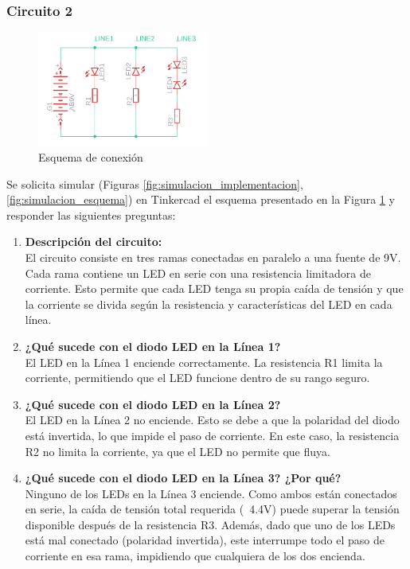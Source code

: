 \documentclass{article}
\begin{document}
\subsubsection{Circuito 2}

\begin{figure}[H]
    \centering
    \includegraphics[width=0.5\textwidth]{./img/ckpt_2_3_0.png}
    \caption{Esquema de conexión}
    \label{fig:circuito_2}
\end{figure}

Se solicita simular (Figuras \ref{fig:simulacion_implementacion}, \ref{fig:simulacion_esquema}) en Tinkercad el esquema presentado en la Figura \ref{fig:circuito_2} y responder las siguientes preguntas:

\begin{enumerate}
    \item \textbf{Descripción del circuito:} \\
    El circuito consiste en tres ramas conectadas en paralelo a una fuente de 9V. Cada rama contiene un LED en serie con una resistencia limitadora de corriente. Esto permite que cada LED tenga su propia caída de tensión y que la corriente se divida según la resistencia y características del LED en cada línea.

    \item \textbf{¿Qué sucede con el diodo LED en la Línea 1?} \\
    El LED en la Línea 1 enciende correctamente. La resistencia R1 limita la corriente, permitiendo que el LED funcione dentro de su rango seguro.

    \item \textbf{¿Qué sucede con el diodo LED en la Línea 2?} \\
    El LED en la Línea 2 no enciende. Esto se debe a que la polaridad del diodo está invertida, lo que impide el paso de corriente. En este caso, la resistencia R2 no limita la corriente, ya que el LED no permite que fluya.

    \item \textbf{¿Qué sucede con el diodo LED en la Línea 3? ¿Por qué?} \\
    Ninguno de los LEDs en la Línea 3 enciende. Como ambos están conectados en serie, la caída de tensión total requerida (~4.4V) puede superar la tensión disponible después de la resistencia R3. Además, dado que uno de los LEDs está mal conectado (polaridad invertida), este interrumpe todo el paso de corriente en esa rama, impidiendo que cualquiera de los dos encienda.
\end{enumerate}
\end{document}
